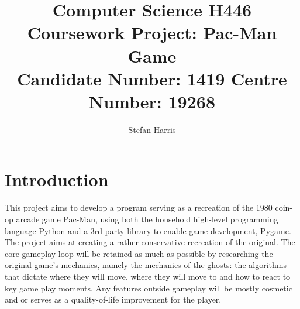 \documentclass[letterpaper, 11pt]{article}
\author{Stefan Harris}
\date{}
\title{Computer Science H446 Coursework Project: Pac-Man Game\\\medskip
\large Candidate Number: 1419 Centre Number: 19268}
\begin{document}
\maketitle
\tableofcontents


\section{Introduction}
\label{sec:org338a20f}
This project aims to develop a program serving as a recreation of the 1980 coin-op arcade game Pac-Man, using both the household high-level programming language Python and a 3rd party library to enable game development, Pygame.
The project aims at creating a rather conservative recreation of the original.
The core gameplay loop will be retained as much as possible by researching the original game’s mechanics, namely the mechanics of the ghosts: the algorithms that dictate where they will move, where they will move to and how to react to key game play moments.
Any features outside gameplay will be mostly cosmetic and or serves as a quality-of-life improvement for the player.

\printbibliography
\end{document}
